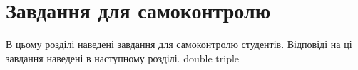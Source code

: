 \chapter{Завдання для самоконтролю}
В цьому розділі наведені завдання для самоконтролю студентів. Відповіді на ці завдання наведені в наступному розділі.
{double}
{triple}
